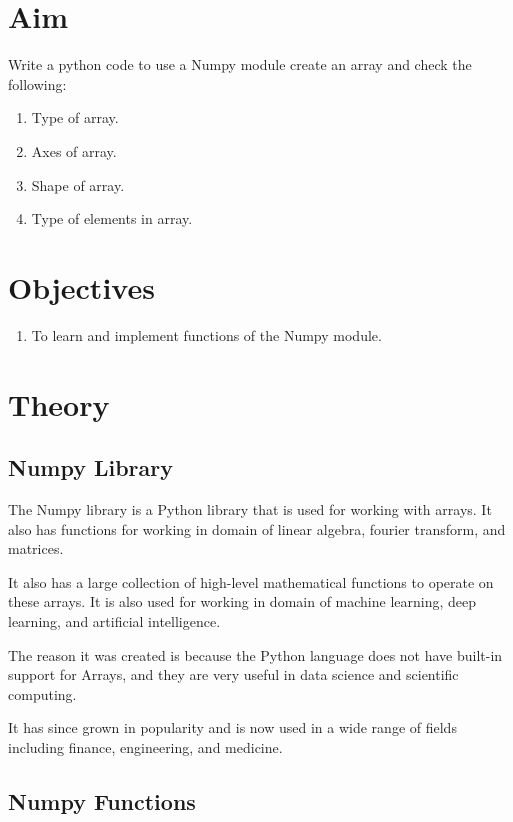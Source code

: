 \documentclass[11pt]{article}
\begin{document}
\tableofcontents
\thispagestyle{empty}
\clearpage

\setcounter{page}{1}

\section{Aim}
Write a python code to use a Numpy module create an array and check the following:
\begin{enumerate}
    \item Type of array.
    \item Axes of array.
    \item Shape of array.
    \item Type of elements in array.
\end{enumerate}

\section{Objectives}
\begin{enumerate}
    \item To learn and implement functions of the Numpy module.
\end{enumerate}

\section{Theory}
\subsection{Numpy Library}
The Numpy library is a Python library that is used for working with arrays. It also has functions for working in domain of linear algebra, fourier transform, and matrices.

It also has a large collection of high-level mathematical functions to operate on these arrays. It is also used for working in domain of machine learning, deep learning, and artificial intelligence.

The reason it was created is because the Python language does not have built-in support for Arrays, and they are very useful in data science and scientific computing.

It has since grown in popularity and is now used in a wide range of fields including finance, engineering, and medicine.

\subsection{Numpy Functions}
\end{document}
